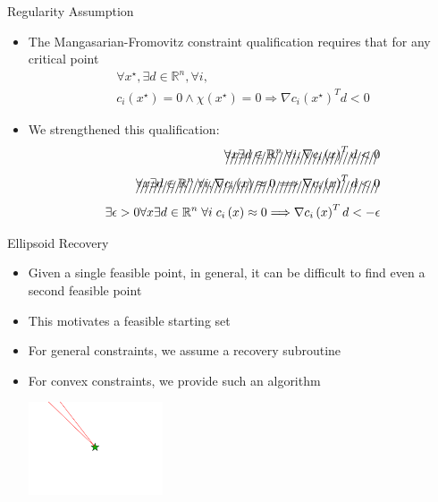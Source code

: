\documentclass{beamer}
\newcommand{\Rn}{\mathbb R ^ {n}}
\begin{document}
\begin{frame}{Regularity Assumption}
\begin{itemize}
\item The Mangasarian-Fromovitz constraint qualification requires that for any critical point 
\begin{align*}
\forall x^{\star}, \exists d \in \Rn, \forall i, \\
c_i\left(x^{\star}\right)=0 \wedge \chi\left(x^{\star}\right) = 0 \Longrightarrow \nabla c_i\left(x^{\star}\right)^T d < 0 
\end{align*}
\item We strengthened this qualification:
\begin{align*}
\xout{\forall x \exists d \in \Rn\; \forall i, \nabla c_i\left(x\right)^T d < 0} \\
\xout{\forall x \exists d \in \Rn\; \forall i, \nabla c_i\left(x\right) \approx 0 \Longrightarrow \nabla c_i\left(x\right)^T d < 0} \\
\exists \epsilon>0 \forall x\exists d\in \Rn\; \forall i\; c_i\left(x\right) \approx 0
\Longrightarrow \nabla c_i\left(x\right)^T d < -\epsilon \\
\end{align*}
\end{itemize}
\end{frame}



\begin{frame}{Ellipsoid Recovery}
\begin{itemize}
	\item Given a single feasible point, in general, it can be difficult to find even a second feasible point
	\item This motivates a feasible starting set
	\item For general constraints, we assume a recovery subroutine
	\item For convex constraints, we provide such an algorithm
	\begin{center}
		\includegraphics[width=150px]{images/only_one_feasible_point.png}
	\end{center}
\end{itemize}
\end{frame}
\end{document}
